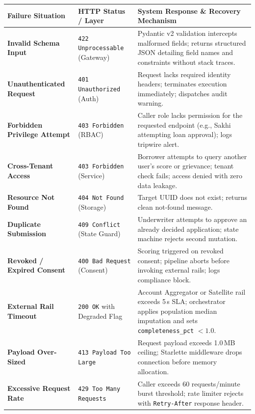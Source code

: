 \documentclass[11pt,a4paper,oneside]{report}
\begin{document}
\begin{table}[H]
\centering
\small
\renewcommand{\arraystretch}{1.2}
\begin{tabularx}{\textwidth}{p{3.2cm} p{3.6cm} X}
  \toprule
  \textbf{Failure Situation} & \textbf{HTTP Status / Layer} & \textbf{System Response \& Recovery Mechanism} \\
  \midrule
  \textbf{Invalid Schema Input} & \texttt{422 Unprocessable} (Gateway) & Pydantic v2 validation intercepts malformed fields; returns structured JSON detailing field names and constraints without stack traces. \\
  \addlinespace
  \textbf{Unauthenticated Request} & \texttt{401 Unauthorized} (Auth) & Request lacks required identity headers; terminates execution immediately; dispatches audit warning. \\
  \addlinespace
  \textbf{Forbidden Privilege Attempt} & \texttt{403 Forbidden} (RBAC) & Caller role lacks permission for the requested endpoint (e.g., Sakhi attempting loan approval); logs tripwire alert. \\
  \addlinespace
  \textbf{Cross-Tenant Access} & \texttt{403 Forbidden} (Service) & Borrower attempts to query another user's score or grievance; tenant check fails; access denied with zero data leakage. \\
  \addlinespace
  \textbf{Resource Not Found} & \texttt{404 Not Found} (Storage) & Target UUID does not exist; returns clean not-found message. \\
  \addlinespace
  \textbf{Duplicate Submission} & \texttt{409 Conflict} (State Guard) & Underwriter attempts to approve an already decided application; state machine rejects second mutation. \\
  \addlinespace
  \textbf{Revoked / Expired Consent} & \texttt{400 Bad Request} (Consent) & Scoring triggered on revoked consent; pipeline aborts before invoking external rails; logs compliance block. \\
  \addlinespace
  \textbf{External Rail Timeout} & \texttt{200 OK} with Degraded Flag & Account Aggregator or Satellite rail exceeds 5\,s SLA; orchestrator applies population median imputation and sets \texttt{completeness\_pct} $<1.0$. \\
  \addlinespace
  \textbf{Payload Over-Sized} & \texttt{413 Payload Too Large} & Request payload exceeds 1.0\,MB ceiling; Starlette middleware drops connection before memory allocation. \\
  \addlinespace
  \textbf{Excessive Request Rate} & \texttt{429 Too Many Requests} & Caller exceeds 60 requests/minute burst threshold; rate limiter rejects with \texttt{Retry-After} response header. \\

\end{tabularx}
\end{table}
\end{document}

